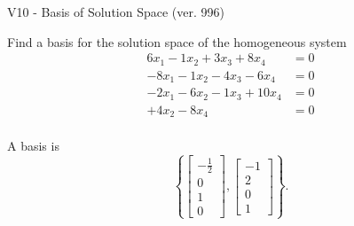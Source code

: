 \begin{exercise}
  \begin{exerciseTitle}V10 - Basis of Solution Space (ver. 996)\end{exerciseTitle}
  \begin{exerciseStatement}
    Find a basis for the solution space of the homogeneous system 
\begin{align*}
 6 x_ 1 -1 x_ 2 + 3 x_ 3 + 8 x_ 4 &= 0  \\ 
  -8 x_ 1 -1 x_ 2 -4 x_ 3 -6 x_ 4 &= 0  \\ 
  -2 x_ 1 -6 x_ 2 -1 x_ 3 + 10 x_ 4 &= 0  \\ 
  + 4 x_ 2 -8 x_ 4 &= 0  \\ 
 \end{align*}


 
  \end{exerciseStatement}

  \begin{exerciseAnswer}
   A basis is   
\[\left\{\left[\begin{array}{c}
-\frac{1}{2} \\
0 \\
1 \\
0
\end{array}\right] , \left[\begin{array}{c}
-1 \\
2 \\
0 \\
1
\end{array}\right]\right\}.\]

  


  \end{exerciseAnswer}
\end{exercise}